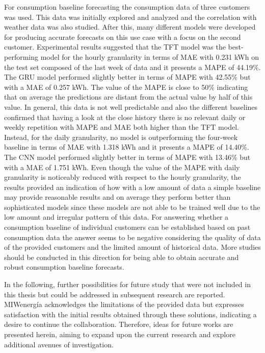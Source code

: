 For consumption baseline forecasting the consumption data of three customers was used.
This data was initially explored and analyzed and the correlation with weather data was also studied.
After this, many different models were developed for producing accurate forecasts on this use case with a focus on the second customer.
Experimental results suggested that the TFT model was the best-performing model for the hourly granularity in terms of MAE with 0.231 kWh on the test set composed of the last week of data and it presents a MAPE of 44.19\%.
The GRU model performed slightly better in terms of MAPE with 42.55\% but with a MAE of 0.257 kWh.
The value of the MAPE is close to 50\% indicating that on average the predictions are distant from the actual value by half of this value.
In general, this data is not well predictable and also the different baselines confirmed that having a look at the close history there is no relevant daily or weekly repetition with MAPE and MAE both higher than the TFT model.
Instead, for the daily granularity, no model is outperforming the four-week baseline in terms of MAE with 1.318 kWh and it presents a MAPE of 14.40\%.
The CNN model performed slightly better in terms of MAPE with 13.46\% but with a MAE of 1.751 kWh.
Even though the value of the MAPE with daily granularity is noticeably reduced with respect to the hourly granularity, the results provided an indication of how with a low amount of data a simple baseline may provide reasonable results and on average they perform better than sophisticated models since these models are not able to be trained well due to the low amount and irregular pattern of this data.
For answering whether a consumption baseline of individual customers can be established based on past consumption data the answer seems to be negative considering the quality of data of the provided customers and the limited amount of historical data.
More studies should be conducted in this direction for being able to obtain accurate and robust consumption baseline forecasts.

In the following, further possibilities for future study that were not included in this thesis but could be addressed in subsequent research are reported.
MIWenergía acknowledges the limitations of the provided data but expresses satisfaction with the initial results obtained through these solutions, indicating a desire to continue the collaboration.
Therefore, ideas for future works are presented herein, aiming to expand upon the current research and explore additional avenues of investigation.

